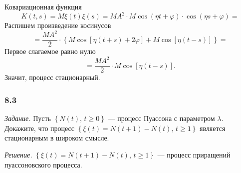 Ковариационная функция
$$K \left( t, s \right) =
  M \xi \left( t \right) \xi \left( s \right) =
  M A^2 \cdot M \cos \left( \eta t + \varphi \right) \cdot \cos \left( \eta s + \varphi \right) =$$
Распишем произведение косинусов
$$= \frac{MA^2}{2} \cdot \left\{
  M \cos \left[ \eta \left( t + s \right) + 2 \varphi \right] +
  M \cos \left[ \eta \left( t - s \right) \right] \right\} =$$
Первое слагаемое равно нулю
$$= \frac{MA^2}{2} \cdot M \cos \left[ \eta \left( t - s \right) \right].$$
Значит, процесс стационарный.

\subsubsection*{8.3}

\textit{Задание.}
Пусть $ \left\{ N \left( t \right), \, t \geq 0 \right\} $ ---
процесс Пуассона с параметром $ \lambda $.
Докажите, что процесс
$ \left\{ \xi \left( t \right) = N \left( t + 1 \right) - N \left( t \right), \, t \geq 1 \right\} $
является стационарным в широком смысле.

\textit{Решение.}
$ \left\{ \xi \left( t \right) = N \left( t + 1 \right) - N \left( t \right), \, t \geq 1 \right\} $
--- процесс приращений пуассоновского процесса.

